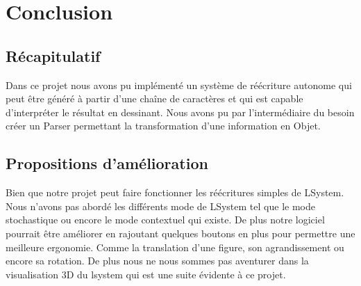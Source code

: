 \documentclass[12pt]{article}
\begin{document}
\section{Conclusion}
\subsection{Récapitulatif}
Dans ce projet nous avons pu implémenté un système de réécriture autonome qui peut être généré à partir d'une chaîne de caractères et qui est capable d'interpréter le résultat en dessinant. Nous avons pu par l'intermédiaire du besoin créer un Parser permettant la transformation d'une information en Objet.


\subsection{Propositions d'amélioration}
Bien que notre projet peut faire fonctionner les réécritures simples de LSystem. Nous n'avons pas abordé les différents mode de LSystem tel que le mode stochastique ou encore le mode contextuel qui existe. De plus notre logiciel pourrait être améliorer en rajoutant quelques boutons en plus pour permettre une meilleure ergonomie. Comme la translation d'une figure, son agrandissement ou encore sa rotation. De plus nous ne nous sommes pas aventurer dans la visualisation 3D du lsystem qui est une suite évidente à ce projet.
\end{document}
